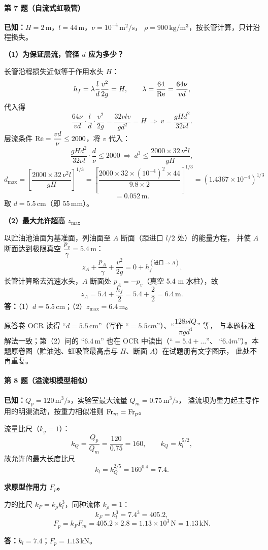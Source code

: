 \paragraph{第 7 题（自流式虹吸管）}
\begin{jie}
\textbf{已知：}$H=2\,\mathrm{m}$，$l=44\,\mathrm{m}$，$\nu=10^{-4}\,\mathrm{m^2/s}$，
$\rho=900\,\mathrm{kg/m^3}$，按长管计算，只计沿程损失。

\textbf{（1）为保证层流，管径 $d$ 应为多少？}

长管沿程损失近似等于作用水头 $H$：
\[
h_f=\lambda\frac{l}{d}\frac{v^{2}}{2g}=H,\qquad \lambda=\frac{64}{\mathrm{Re}}=\frac{64\nu}{vd},
\]
代入得
\[
\frac{64\nu}{vd}\cdot\frac{l}{d}\cdot\frac{v^{2}}{2g}=\frac{32\nu l v}{gd^{2}}=H
\ \Longrightarrow\
v=\frac{gHd^{2}}{32\nu l}.
\]
层流条件 $\mathrm{Re}=\dfrac{vd}{\nu}\le 2000$，将 $v$ 代入：
\[
\frac{gHd^{2}}{32\nu l}\cdot\frac{d}{\nu}\le2000
\ \Longrightarrow\
d^{3}\le\frac{2000\times32\,\nu^{2}l}{gH},
\]
\[
d_{\max}=\left[\frac{2000\times32\,\nu^{2}l}{gH}\right]^{1/3}
=\left[\frac{2000\times32\times(10^{-4})^{2}\times44}{9.8\times2}\right]^{1/3}
=(1.4367\times10^{-4})^{1/3}
\]
\[
=0.052\,\mathrm{m}.
\]
取 $d=5.5\,\mathrm{cm}$（即 $55\,\mathrm{mm}$）。

\textbf{（2）最大允许超高 $z_{\max}$}

以贮油池油面为基准面，列油面至 $A$ 断面（距进口 $l/2$ 处）的能量方程，
并使 $A$ 断面达到极限真空 $\dfrac{p_v}{\gamma}=5.4\,\mathrm{m}$：
\[
z_A+\frac{p_A}{\gamma}+\frac{v^{2}}{2g}=0+h_f^{(\text{进口}\to A)} .
\]
长管计算略去流速水头，$A$ 断面处 $p_A=-p_v$（真空 5.4 m 水柱），故
\[
z_A=5.4+\frac{h_f}{2}=5.4+\frac{2}{2}=6.4\,\mathrm{m}.
\]
\textbf{答：}（1）$d=5.5\,\mathrm{cm}$；（2）$z_{\max}=6.4\,\mathrm{m}$。
\end{jie}

\begin{tishi}
原答卷 OCR 读得 ``$d=5.5\,\mathrm{cm}$''（写作 ``$=5.5cm$''）、``$\dfrac{128\nu lQ}{\pi gd^{4}}$'' 等，
与本题标准解法一致；第（2）问的 ``$6.4\,\mathrm{m}$'' 也在 OCR 中读出（``$=5.4+\ldots$''、
``$6.4m$''）。本题原卷图（贮油池、虹吸管最高点与 $H$、断面 $A$）在试题册有文字图示，
此处不再重复。
\end{tishi}

\paragraph{第 8 题（溢流坝模型相似）}
\begin{jie}
\textbf{已知：}$Q_p=120\,\mathrm{m^3/s}$，实验室最大流量 $Q_m=0.75\,\mathrm{m^3/s}$，
溢流坝为重力起主导作用的明渠流动，按重力相似准则 $\mathrm{Fr}_m=\mathrm{Fr}_p$。

流量比尺（$k_g=1$）：
\[
k_Q=\frac{Q_p}{Q_m}=\frac{120}{0.75}=160,\qquad
k_Q=k_l^{5/2},
\]
故允许的最大长度比尺
\[
k_l=k_Q^{2/5}=160^{0.4}=7.4 .
\]

\textbf{求原型作用力 $F_p$。}

力的比尺 $k_F=k_\rho k_l^{3}$，同种流体 $k_\rho=1$：
\[
k_F=k_l^{3}=7.4^{3}=405.2 ,
\]
\[
F_p=k_F F_m=405.2\times2.8=1.13\times10^{3}\,\mathrm{N}=1.13\,\mathrm{kN}.
\]

\textbf{答：}$k_l=7.4$；$F_p=1.13\,\mathrm{kN}$。
\end{jie}

